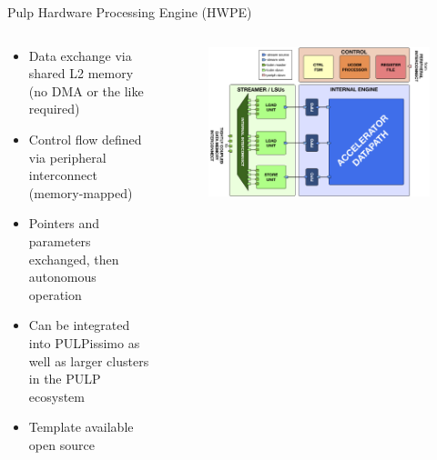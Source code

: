 \documentclass[aspectratio=169, nobackgroundmain]{beamer}
\begin{document}
\begin{frame}[fragile]{Pulp Hardware Processing Engine (HWPE)}
  \begin{columns}
      \begin{column}{0.5\textwidth}
          \begin{itemize}
          \item Data exchange via shared L2 memory (no DMA or the like required)
          \item Control flow defined via peripheral interconnect (memory-mapped)
          \item Pointers and parameters exchanged, then autonomous operation
          \item Can be integrated into PULPissimo as well as larger clusters in the PULP ecosystem
          \item Template available open source
      \end{itemize}
      \end{column}
      \begin{column}{0.49\textwidth}
          \begin{figure}
              \raggedleft
              \includegraphics[width=1\textwidth]{hwpe.png}
          \end{figure}
      \end{column}
  \end{columns}
\end{frame}
\end{document}
